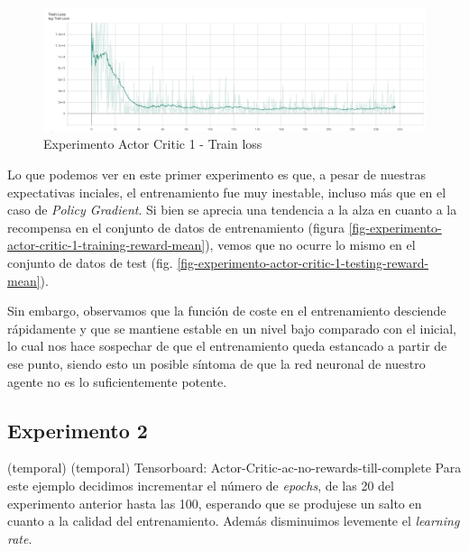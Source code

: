 \begin{figure}[H]
	\centering
	\includegraphics[width=1\textwidth]{figuras/experiments/actor_critic/actor_critic_20_epochs/train_loss.png}
	\caption[Experimento Actor Critic 1 - Train loss]{Experimento Actor Critic 1 - Train loss}
	\label{fig-experimento-actor-critic-1-train-loss}
\end{figure}
\medskip

Lo que podemos ver en este primer experimento es que, a pesar de nuestras expectativas inciales, el entrenamiento fue muy inestable, incluso más que en el caso de \textit{Policy Gradient}. Si bien se aprecia una tendencia a la alza en cuanto a la recompensa en el conjunto de datos de entrenamiento (figura \ref{fig-experimento-actor-critic-1-training-reward-mean}), vemos que no ocurre lo mismo en el conjunto de datos de test (fig. \ref{fig-experimento-actor-critic-1-testing-reward-mean}).
\medskip

Sin embargo, observamos que la función de coste en el entrenamiento desciende rápidamente y que se mantiene estable en un nivel bajo comparado con el inicial, lo cual nos hace sospechar de que el entrenamiento queda estancado a partir de ese punto, siendo esto un posible síntoma de que la red neuronal de nuestro agente no es lo suficientemente potente.
\medskip

\subsection{Experimento 2}
\label{resultados-actor-critic-experimento-2}

(temporal) (temporal) Tensorboard: Actor-Critic-ac-no-rewards-till-complete
Para este ejemplo decidimos incrementar el número de \textit{epochs}, de las 20 del experimento anterior hasta las 100, esperando que se produjese un salto en cuanto a la calidad del entrenamiento. Además disminuimos levemente el \textit{learning rate}.

